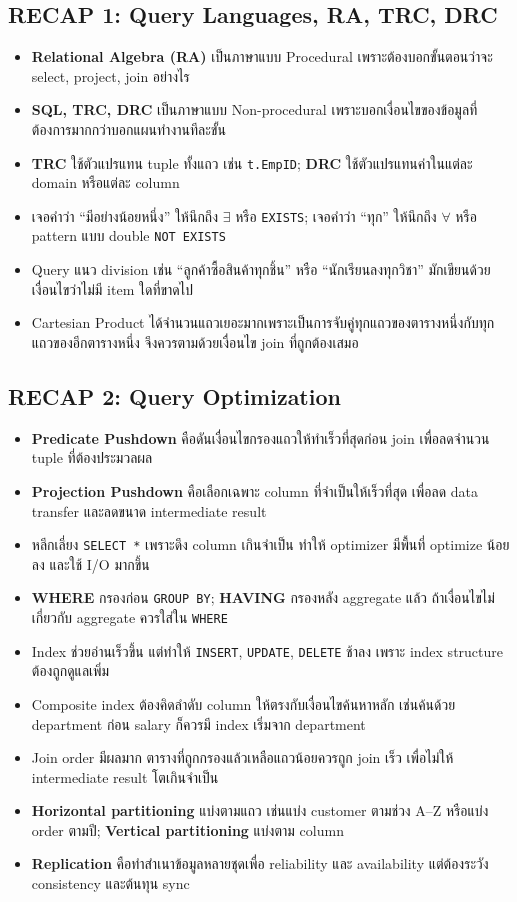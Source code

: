 \documentclass[a4paper,12pt]{article}
\begin{document}
\subsection*{RECAP 1: Query Languages, RA, TRC, DRC}
\begin{itemize}
    \item \textbf{Relational Algebra (RA)} เป็นภาษาแบบ Procedural เพราะต้องบอกขั้นตอนว่าจะ select, project, join อย่างไร
    \item \textbf{SQL, TRC, DRC} เป็นภาษาแบบ Non-procedural เพราะบอกเงื่อนไขของข้อมูลที่ต้องการมากกว่าบอกแผนทำงานทีละขั้น
    \item \textbf{TRC} ใช้ตัวแปรแทน tuple ทั้งแถว เช่น \texttt{t.EmpID}; \textbf{DRC} ใช้ตัวแปรแทนค่าในแต่ละ domain หรือแต่ละ column
    \item เจอคำว่า ``มีอย่างน้อยหนึ่ง'' ให้นึกถึง $\exists$ หรือ \texttt{EXISTS}; เจอคำว่า ``ทุก'' ให้นึกถึง $\forall$ หรือ pattern แบบ double \texttt{NOT EXISTS}
    \item Query แนว division เช่น ``ลูกค้าซื้อสินค้าทุกชิ้น'' หรือ ``นักเรียนลงทุกวิชา'' มักเขียนด้วยเงื่อนไขว่าไม่มี item ใดที่ขาดไป
    \item Cartesian Product ได้จำนวนแถวเยอะมากเพราะเป็นการจับคู่ทุกแถวของตารางหนึ่งกับทุกแถวของอีกตารางหนึ่ง จึงควรตามด้วยเงื่อนไข join ที่ถูกต้องเสมอ
\end{itemize}

\subsection*{RECAP 2: Query Optimization}
\begin{itemize}
    \item \textbf{Predicate Pushdown} คือดันเงื่อนไขกรองแถวให้ทำเร็วที่สุดก่อน join เพื่อลดจำนวน tuple ที่ต้องประมวลผล
    \item \textbf{Projection Pushdown} คือเลือกเฉพาะ column ที่จำเป็นให้เร็วที่สุด เพื่อลด data transfer และลดขนาด intermediate result
    \item หลีกเลี่ยง \texttt{SELECT *} เพราะดึง column เกินจำเป็น ทำให้ optimizer มีพื้นที่ optimize น้อยลง และใช้ I/O มากขึ้น
    \item \textbf{WHERE} กรองก่อน \texttt{GROUP BY}; \textbf{HAVING} กรองหลัง aggregate แล้ว ถ้าเงื่อนไขไม่เกี่ยวกับ aggregate ควรใส่ใน \texttt{WHERE}
    \item Index ช่วยอ่านเร็วขึ้น แต่ทำให้ \texttt{INSERT}, \texttt{UPDATE}, \texttt{DELETE} ช้าลง เพราะ index structure ต้องถูกดูแลเพิ่ม
    \item Composite index ต้องคิดลำดับ column ให้ตรงกับเงื่อนไขค้นหาหลัก เช่นค้นด้วย department ก่อน salary ก็ควรมี index เริ่มจาก department
    \item Join order มีผลมาก ตารางที่ถูกกรองแล้วเหลือแถวน้อยควรถูก join เร็ว เพื่อไม่ให้ intermediate result โตเกินจำเป็น
    \item \textbf{Horizontal partitioning} แบ่งตามแถว เช่นแบ่ง customer ตามช่วง A--Z หรือแบ่ง order ตามปี; \textbf{Vertical partitioning} แบ่งตาม column
    \item \textbf{Replication} คือทำสำเนาข้อมูลหลายชุดเพื่อ reliability และ availability แต่ต้องระวัง consistency และต้นทุน sync
\end{itemize}
\end{document}
